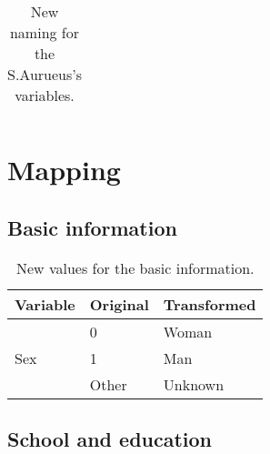 \begin{table}[H]
\begin{tabular}{ l | l }
    \end{tabular}%

    \caption{New naming for the S.Aurueus's variables.}
    
\end{table}



\section{Mapping}

\subsection{Basic information}

\begin{table}[H]
	\centering

    \label{table:Table_Basic_Info_Transform_Categories}
    
	\renewcommand{\arraystretch}{1.5}

    \begin{tabular}{l | l | l}
		\hline
        \rowcolor[HTML]{FF9999}		
		
        \textbf{Variable} & \textbf{Original} & \textbf{Transformed} \\ 		
        
        \hline 
		
            \multirow{3}{*}{Sex}    & \multicolumn{1}{l}{0}     & \multicolumn{1}{l}{Woman}   \\\cline{2-3}
                                    & \multicolumn{1}{l}{1}     & \multicolumn{1}{l}{Man}     \\\cline{2-3}
                                    & \multicolumn{1}{l}{Other} & \multicolumn{1}{l}{Unknown} \\\hline

        \end{tabular}

    \caption{New values for the basic information.}

\end{table}



\subsection{School and education}

